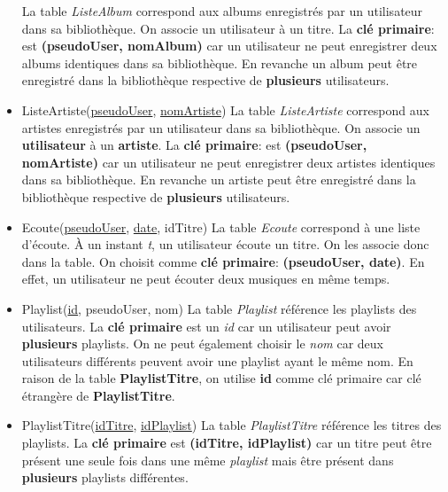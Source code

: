 \documentclass[a4paper,12pt, french]{report}
\begin{document}
\begin{itemize}
        La table \emph{ListeAlbum} correspond aux albums enregistrés par un utilisateur dans sa bibliothèque. On associe un utilisateur à un titre. La \textbf{clé primaire}: est \textbf{(pseudoUser, nomAlbum)} car un utilisateur ne peut enregistrer deux albums identiques dans sa bibliothèque. En revanche un album peut être enregistré dans la bibliothèque respective de \textbf{plusieurs} utilisateurs.
      \item ListeArtiste(\underline{pseudoUser}, \underline{nomArtiste}) \newline
        La table \emph{ListeArtiste} correspond aux artistes enregistrés par un utilisateur dans sa bibliothèque. On associe un \textbf{utilisateur} à un \textbf{artiste}. La \textbf{clé primaire}: est \textbf{(pseudoUser, nomArtiste)} car un utilisateur ne peut enregistrer deux artistes identiques dans sa bibliothèque. En revanche un artiste peut être enregistré dans la bibliothèque respective de \textbf{plusieurs} utilisateurs.
      \item Ecoute(\underline{pseudoUser}, \underline{date}, idTitre) \newline
        La table \emph{Ecoute} correspond à une liste d'écoute. À un instant \emph{t}, un utilisateur écoute un titre. On les associe donc dans la table. On choisit comme \textbf{clé primaire}: \textbf{(pseudoUser, date)}. En effet, un utilisateur ne peut écouter deux musiques en même temps.
      \item Playlist(\underline{id}, pseudoUser, nom) \newline
        La table \emph{Playlist} référence les playlists des utilisateurs. La \textbf{clé primaire} est un \emph{id} car un utilisateur peut avoir \textbf{plusieurs} playlists. On ne peut également choisir le \emph{nom} car deux utilisateurs différents peuvent avoir une playlist ayant le même nom. En raison de la table \textbf{PlaylistTitre}, on utilise \textbf{id} comme clé primaire car clé étrangère de \textbf{PlaylistTitre}.
      \item PlaylistTitre(\underline{idTitre}, \underline{idPlaylist}) \newline
        La table \emph{PlaylistTitre} référence les titres des playlists. La \textbf{clé primaire} est \textbf{(idTitre, idPlaylist)} car un titre peut être présent une seule fois dans une même \emph{playlist} mais être présent dans \textbf{plusieurs} playlists différentes.
    \end{itemize}
\end{document}
